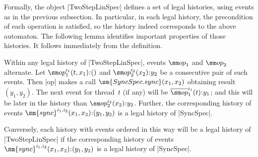 Formally, the object |TwoStepLinSpec| defines a set of legal histories, using
events as in the previous subsection.  In particular, in each legal history,
the precondition of each operation is satisfied, so the history indeed
corresponds to the above automaton.
%
The following lemma identifies important properties of those histories.
It follows immediately from the definition.
%
\begin{lemma}
\label{lem:TwoStepLinSpec-histories}
Within any legal history of |TwoStepLinSpec|, events $\op_1$ and
$\op_2$ alternate.  Let $\op_1^{i_1}(t,x_1) \:: ()$ and $\op_2^{i_2}(x_2) \::
y_2$ be a consecutive pair of such events.  Then |op| makes a call
$\sm{SyncSpec.sync}(x_1, x_2)$ obtaining result $(y_1,y_2)$.  The next event
for thread~$t$ (if any) will be $\overline\op_1^{i_1}(t) \:: y_1$; and this
will be later in the history than $\op_2^{i_2}(x_2) \:: y_2$.  Further, the
corresponding history of events $\sm{sync}^{i_1,i_2}(x_1,x_2) \:: (y_1,y_2)$
is a legal history of |SyncSpec|.

Conversely, each history with events ordered in this way will be a legal
history of |TwoStepLinSpec| if  the corresponding history
of events $\sm{sync}^{i_1,i_2}(x_1,x_2) \:: (y_1,y_2)$ is a legal history of
|SyncSpec|.
\end{lemma}


